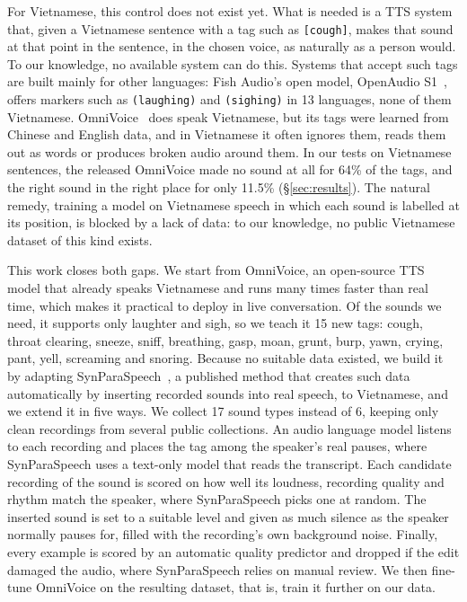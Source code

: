 \documentclass{article} %
\begin{document}
For Vietnamese, this control does not exist yet. What is needed is a TTS system that, given a
Vietnamese sentence with a tag such as \texttt{[cough]}, makes that sound at that point in the
sentence, in the chosen voice, as naturally as a person would. To our knowledge, no available
system can do this. Systems that accept such tags are built mainly for other languages: Fish
Audio's open model, OpenAudio S1~\citep{openaudios1}, offers markers such as
\texttt{(laughing)} and \texttt{(sighing)} in 13 languages, none of them Vietnamese.
OmniVoice~\citep{omnivoice} does speak Vietnamese, but its tags were learned from Chinese and
English data, and in Vietnamese it often ignores them, reads them out as words or produces
broken audio around them. In our tests on Vietnamese sentences, the released OmniVoice made no
sound at all for 64\% of the tags, and the right sound in the right place for only 11.5\%
(\S\ref{sec:results}). The natural remedy, training a model on Vietnamese speech in which each
sound is labelled at its position, is blocked by a lack of data: to our knowledge, no public
Vietnamese dataset of this kind exists.

This work closes both gaps. We start from OmniVoice, an open-source TTS model that already
speaks Vietnamese and runs many times faster than real time, which makes it practical to deploy
in live conversation. Of the sounds we need, it supports only laughter and sigh, so we teach it
15 new tags: cough, throat clearing, sneeze, sniff, breathing, gasp, moan, grunt, burp, yawn,
crying, pant, yell, screaming and snoring. Because no suitable data existed, we build it by
adapting SynParaSpeech~\citep{synparaspeech}, a published method that creates such data
automatically by inserting recorded sounds into real speech, to Vietnamese, and we extend it in
five ways. We collect 17 sound types instead of 6, keeping only clean recordings from several
public collections. An audio language model listens to each recording and places the tag
among the speaker's real pauses, where SynParaSpeech uses a text-only model that reads the
transcript. Each candidate recording of the sound is scored on how well its loudness, recording
quality and rhythm match the speaker, where SynParaSpeech picks one at random. The inserted
sound is set to a suitable level and given as much silence as the speaker normally pauses for,
filled with the recording's own background noise. Finally, every example is scored by an
automatic quality predictor and dropped if the edit damaged the audio, where SynParaSpeech
relies on manual review. We then fine-tune OmniVoice on the resulting dataset, that is, train
it further on our data.
\end{document}
